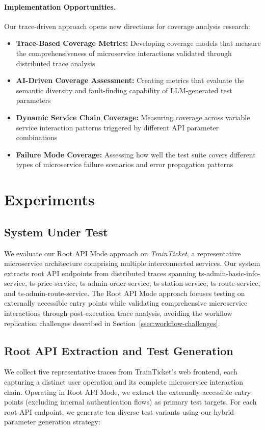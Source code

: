 \documentclass[conference]{IEEEtran}
\begin{document}
\paragraph{Implementation Opportunities.}
Our trace-driven approach opens new directions for coverage analysis research:
\begin{itemize}[leftmargin=*]
    \item \textbf{Trace-Based Coverage Metrics:} Developing coverage models that measure the comprehensiveness of microservice interactions validated through distributed trace analysis
    \item \textbf{AI-Driven Coverage Assessment:} Creating metrics that evaluate the semantic diversity and fault-finding capability of LLM-generated test parameters
    \item \textbf{Dynamic Service Chain Coverage:} Measuring coverage across variable service interaction patterns triggered by different API parameter combinations
    \item \textbf{Failure Mode Coverage:} Assessing how well the test suite covers different types of microservice failure scenarios and error propagation patterns
\end{itemize}




\section{Experiments}\label{sec:experiments}

\subsection{System Under Test}
We evaluate our Root API Mode approach on \emph{TrainTicket}, a representative microservice architecture comprising multiple interconnected services. Our system extracts root API endpoints from distributed traces spanning ts-admin-basic-info-service, ts-price-service, ts-admin-order-service, ts-station-service, ts-route-service, and ts-admin-route-service. The Root API Mode approach focuses testing on externally accessible entry points while validating comprehensive microservice interactions through post-execution trace analysis, avoiding the workflow replication challenges described in Section~\ref{ssec:workflow-challenges}.

\subsection{Root API Extraction and Test Generation}
We collect five representative traces from TrainTicket's web frontend, each capturing a distinct user operation and its complete microservice interaction chain. Operating in Root API Mode, we extract the externally accessible entry points (excluding internal authentication flows) as primary test targets. For each root API endpoint, we generate ten diverse test variants using our hybrid parameter generation strategy:
\end{document}
